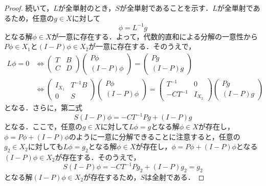 \begin{proof}
  続いて，$L$が全単射のとき，$S$が全単射であることを示す．$L$が全単射であるため，任意の$g \in X$に対して
  \begin{equation*}
    \phi = L^{-1}g
  \end{equation*}
  となる解$\phi \in X$が一意に存在する．よって，代数的直和による分解の一意性から$P\phi \in X_1$と$(I-P)\phi \in X_2$が一意に存在する．そのうえで，
  \begin{equation*}
    \begin{split}
      L\phi=0 &\Leftrightarrow
      \begin{pmatrix}
        T & B \\
        C & D
      \end{pmatrix}
      \begin{pmatrix}
        P \phi \\
        (I-P) \phi
      \end{pmatrix}
      =
      \begin{pmatrix}
        Pg \\
        (I-P)g
      \end{pmatrix}
      \\&\Leftrightarrow
      \begin{pmatrix}
        I_{X_1} & T^{-1}B \\
        0 & S
      \end{pmatrix}
      \begin{pmatrix}
        P \phi \\
        (I-P) \phi
      \end{pmatrix}
      =
      \begin{pmatrix}
        T^{-1} & 0 \\
        -CT^{-1} & I_{X_2}
      \end{pmatrix}
      \begin{pmatrix}
        Pg \\
        (I-P)g
      \end{pmatrix}
    \end{split}
  \end{equation*}
  となる．さらに，第二式
  \begin{equation*}
    S(I-P)\phi = -CT^{-1}Pg + (I-P)g
  \end{equation*}
  となる．ここで，任意の$g \in X$に対して$L\phi=g$となる解$\phi \in X$が存在し，$\phi = P\phi + (I-P)\phi$のように一意に分解できることに注意すると，任意の$g_2 \in X_2$に対しても$L\phi=g_2$となる解$\phi \in X$が存在し，$\phi = P\phi + (I-P)\phi$となる$(I-P)\phi \in X_2$が存在する．そのうえで，
  \begin{equation*}
    S(I-P)\phi = -CT^{-1}Pg_2 + (I-P)g_2=g_2
  \end{equation*}
  となる解$(I-P)\phi \in X_2$が存在するため，$S$は全射である．
\end{proof}

